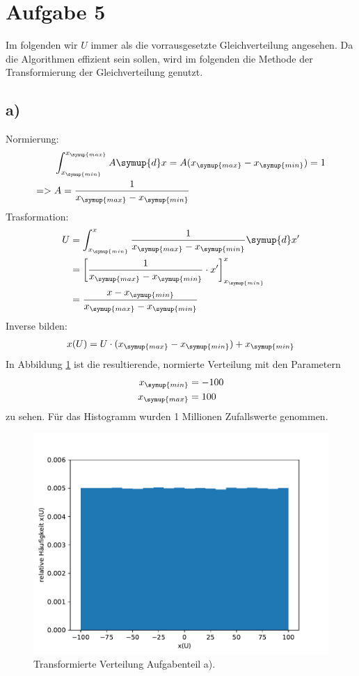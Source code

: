 \section{Aufgabe 5}
Im folgenden wir $U$ immer als die vorrausgesetzte Gleichverteilung angesehen.
Da die Algorithmen effizient sein sollen, wird im folgenden die Methode der Transformierung der Gleichverteilung genutzt.

\subsection{a)}
Normierung:
\begin{align*}
  &\int_{x_{\symup{min}}}^{x_{\symup{max}}} A \symup{d}x = A(x_{\symup{max}}-x_{\symup{min}}) = 1 \\
  => \; &A=\frac{1}{x_{\symup{max}}-x_{\symup{min}}}
\end{align*}
Trasformation:
\begin{align*}
  U &= \int_{x_{\symup{min}}}^{x} \frac{1}{x_{\symup{max}}-x_{\symup{min}}} \symup{d}x'\\
  &= \left[ \frac{1}{x_{\symup{max}}-x_{\symup{min}}} \cdot x' \right]_{x_{\symup{min}}}^{x} \\
  &= \frac{x-x_{\symup{min}}}{x_{\symup{max}}-x_{\symup{min}}}
\end{align*}
Inverse bilden:
\begin{align*}
  x(U) = U \cdot (x_{\symup{max}}-x_{\symup{min}}) + x_{\symup{min}}
\end{align*}
In Abbildung \ref{5.a} ist die resultierende, normierte Verteilung mit den Parametern
\begin{align*}
  x_{\symup{min}} &= -100 \\
  x_{\symup{max}} &= 100
\end{align*}
zu sehen. Für das Histogramm wurden 1 Millionen Zufallswerte genommen.
\begin{figure}[h]
  \centering
  \includegraphics[scale=0.7]{Aufgabe05/Transformierte1.pdf}
  \caption{Transformierte Verteilung Aufgabenteil a).}
  \label{5.a}
\end{figure}


